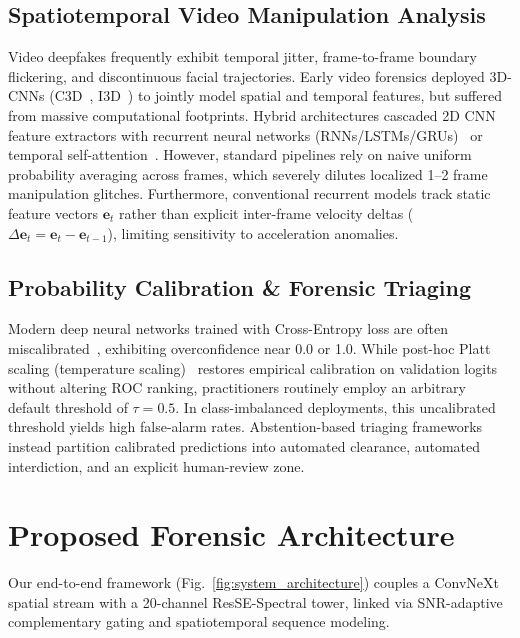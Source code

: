 \documentclass[10pt,twocolumn,letterpaper]{article}
\begin{document}
\subsection{Spatiotemporal Video Manipulation \mbox{Analysis}}
Video deepfakes frequently exhibit temporal jitter, frame-to-frame boundary flickering, and discontinuous facial trajectories. Early video forensics deployed 3D-CNNs (C3D~\cite{tran2015learning}, I3D~\cite{carreira2017quo}) to jointly model spatial and temporal features, but suffered from massive computational footprints. Hybrid architectures cascaded 2D CNN feature extractors with recurrent neural networks (RNNs/LSTMs/GRUs)~\cite{guera2018deepfake,sabir2019recurrent,cho2014learning} or temporal self-attention~\cite{zheng2021exploring}. However, standard pipelines rely on naive uniform probability averaging across frames, which severely dilutes localized 1--2 frame manipulation glitches. Furthermore, conventional recurrent models track static feature vectors $\mathbf{e}_t$ rather than explicit inter-frame velocity deltas ($\Delta \mathbf{e}_t = \mathbf{e}_t - \mathbf{e}_{t-1}$), limiting sensitivity to acceleration anomalies.

\subsection{Probability Calibration \& Forensic Triaging}
Modern deep neural networks trained with Cross-Entropy loss are often miscalibrated~\cite{guo2017calibration}, exhibiting overconfidence near 0.0 or 1.0. While post-hoc Platt scaling (temperature scaling)~\cite{platt1999probabilistic} restores empirical calibration on validation logits without altering ROC ranking, practitioners routinely employ an arbitrary default threshold of $\tau = 0.5$. In class-imbalanced deployments, this uncalibrated threshold yields high false-alarm rates. Abstention-based triaging frameworks~\cite{kompa2021second} instead partition calibrated predictions into automated clearance, automated interdiction, and an explicit human-review zone.

\section{Proposed Forensic Architecture}
\label{sec:method}

Our end-to-end framework (Fig.~\ref{fig:system_architecture}) couples a ConvNeXt spatial stream with a 20-channel ResSE-Spectral tower, linked via SNR-adaptive complementary gating and spatiotemporal sequence modeling.
\end{document}
